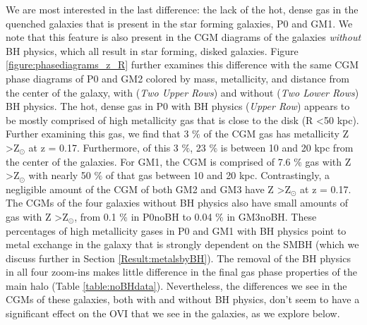 \documentclass[]{emulateapj}
\begin{document}
We are most interested in the last difference: the lack of the hot, dense gas in the quenched galaxies that is present in the star forming galaxies, P0 and GM1. We note that this feature is also present in the CGM diagrams of the galaxies \textit{without} BH physics, which all result in star forming, disked galaxies. Figure \ref{figure:phasediagrams_z_R} further examines this difference with the same CGM phase diagrams of P0 and GM2 colored by mass, metallicity, and distance from the center of the galaxy, with (\textit{Two Upper Rows}) and without (\textit{Two Lower Rows}) BH physics. The hot, dense gas in P0 with BH physics (\textit{Upper Row}) appears to be mostly comprised of high metallicity gas that is close to the disk (R \textless 50 kpc). Further examining this gas, we find that 3 $\%$ of the CGM gas has metallicity Z \textgreater Z$_{\odot}$ at z = 0.17. Furthermore, of this 3 $\%$, 23 $\%$ is between 10 and 20 kpc from the center of the galaxies. For GM1, the CGM is comprised of 7.6 $\%$ gas with Z \textgreater Z$_{\odot}$ with nearly 50 $\%$ of that gas between 10 and 20 kpc. Contrastingly, a negligible amount of the CGM of both GM2 and GM3 have Z \textgreater Z$_{\odot}$ at z = 0.17. The CGMs of the four galaxies without BH physics also have small amounts of gas with Z \textgreater Z$_{\odot}$, from 0.1 $\%$ in P0noBH to 0.04 $\%$ in GM3noBH. These percentages of high metallicity gases in P0 and GM1 with BH physics point to metal exchange in the galaxy that is strongly dependent on the SMBH (which we discuss further in Section \ref{Result:metalsbyBH}). The removal of the BH physics in all four zoom-ins makes little difference in the final gas phase properties of the main halo (Table \ref{table:noBHdata}). Nevertheless, the differences we see in the CGMs of these galaxies, both with and without BH physics, don't seem to have a significant effect on the OVI that we see in the galaxies, as we explore below.
\end{document}
